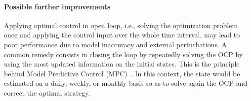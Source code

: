 \paragraph{Possible further improvements} Applying optimal control in open loop, i.e., solving the optimization problem once and applying the control input over the whole time interval, may lead to poor performance due to model inaccuracy and external perturbations. A common remedy consists in closing the loop by repeatedly solving the OCP by using the most updated information on the initial states. This is the principle behind Model Predictive Control (MPC)~\cite{Rawlings:ModelPredictiveControl:2017}. In this context, the state would be estimated on a daily, weekly, or monthly basis so as to solve again the OCP and correct the optimal strategy.



